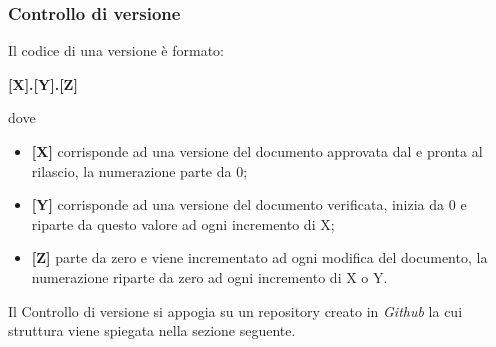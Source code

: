 \subsubsection{Controllo di versione}\label{Versionamento}
Il codice di una versione è formato: 
\begin{center}
	\textbf{[X].[Y].[Z]}
\end{center}
dove 
\begin{itemize}
	\item \textbf{[X]} corrisponde ad una versione del documento approvata dal \Responsabile e pronta al rilascio, la numerazione parte da 0;
	\item \textbf{[Y]} corrisponde ad una versione del documento verificata, inizia da 0 e riparte da questo valore ad ogni incremento di X;
	\item \textbf{[Z]} parte da zero e viene incrementato ad ogni modifica del documento, la numerazione riparte da zero ad ogni incremento di X o Y.
\end{itemize}
Il Controllo di versione si appogia su un repository creato in \textit{Github} la cui struttura viene spiegata nella sezione seguente.


